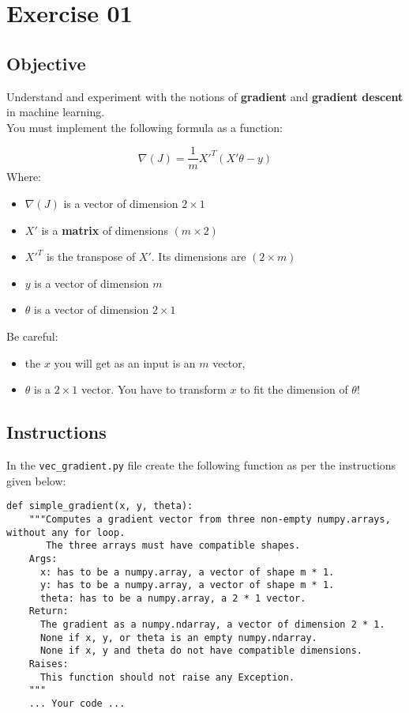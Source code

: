 \chapter{Exercise 01}

\newpage
{}
\makeheaderfilesforbidden

\section*{Objective}
Understand and experiment with the notions of \textbf{gradient} and \textbf{gradient descent} in machine learning.\\
\newline
You must implement the following formula as a function:

$$
\nabla(J) = \frac{1}{m} {X'}^T(X'\theta - y)
$$  
Where:
\begin{itemize}
  \item $\nabla(J)$ is a vector of dimension $2 \times 1$
  \item $X'$ is a \textbf{matrix} of dimensions $(m \times 2)$
  \item ${X'}^T$ is the transpose of $X'$. Its dimensions are $(2 \times m)$
  \item $y$ is a vector of dimension $m$
  \item $\theta$ is a vector of dimension $2 \times 1$ 
\end{itemize}
Be careful:
\begin{itemize}
  \item the $x$ you will get as an input is an $m$ vector,
  \item $\theta$ is a $2 \times 1$ vector. You have to transform $x$ to fit the dimension of $\theta$!
\end{itemize}
\newpage
\section*{Instructions}
In the \texttt{vec\_gradient.py} file create the following function as per the instructions given below:
\newline
\par
\begin{verbatim}
def simple_gradient(x, y, theta):
    """Computes a gradient vector from three non-empty numpy.arrays, without any for loop.
       The three arrays must have compatible shapes.
    Args:
      x: has to be a numpy.array, a vector of shape m * 1.
      y: has to be a numpy.array, a vector of shape m * 1.
      theta: has to be a numpy.array, a 2 * 1 vector.
    Return:
      The gradient as a numpy.ndarray, a vector of dimension 2 * 1.
      None if x, y, or theta is an empty numpy.ndarray.
      None if x, y and theta do not have compatible dimensions.
    Raises:
      This function should not raise any Exception.
    """
    ... Your code ...
\end{verbatim}

